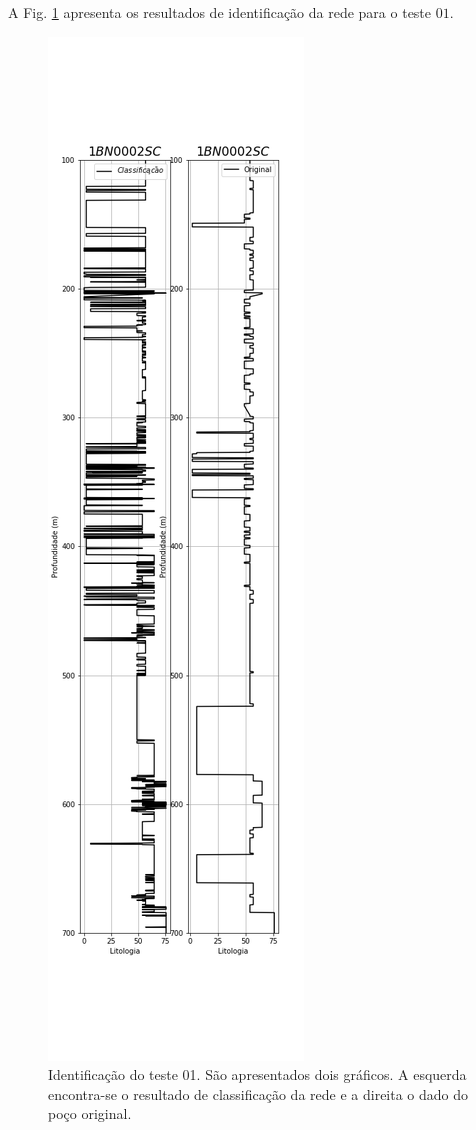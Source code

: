A Fig. \ref{IDt01} apresenta os resultados de identificação da rede para o teste $01$.

\begin{figure}[H]
	\centering
	\includegraphics[scale=0.4]{Imagens/result01.png}
	\caption{Identificação do teste 01. São apresentados dois gráficos. A esquerda encontra-se o resultado de classificação da rede e a direita o dado do poço original.}
	\label{IDt01}
\end{figure} 

